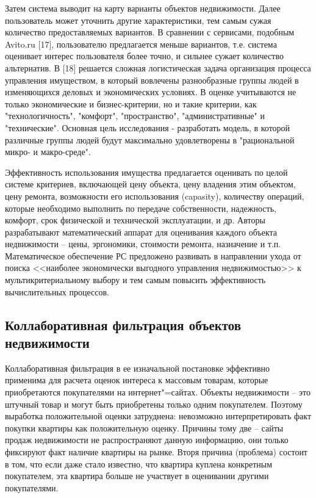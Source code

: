 \documentclass[a4paper,14pt,openany,final]{extreport} %
\begin{document}
Затем система выводит на карту варианты объектов недвижимости. Далее пользователь может уточнить другие характеристики, тем самым сужая количество предоставляемых вариантов. В сравнении с сервисами, подобным Avito.ru [17], пользователю предлагается меньше вариантов, т.е. система оценивает интерес пользователя более точно, и сильнее сужает количество альтернатив.
В [18] решается сложная логистическая задача организация процесса управления имуществом, в который вовлечены разнообразные группы людей в изменяющихся деловых и экономических условиях. В оценке учитываются не только экономические и бизнес-критерии, но и такие критерии, как "технологичность", "комфорт", "пространство", "административные" и "технические". Основная цель исследования - разработать модель, в которой различные группы людей будут максимально удовлетворены в "рациональной микро- и макро-среде".

Эффективность использования имущества предлагается оценивать по целой системе критериев, включающей цену объекта, цену владения этим объектом, цену ремонта, возможности его использования (capasity), количеству операций, которые необходимо выполнить по передаче собственности, надежность, комфорт, срок физической и технической эксплуатации, и др. Авторы разрабатывают математический аппарат для оценивания каждого объекта недвижимости – цены, эргономики, стоимости ремонта, назначение и т.п. Математическое обеспечение РС предложено развивать в направлении ухода от поиска <<наиболее экономически выгодного управления недвижимостью>> к мультикритериальному выбору и тем самым повысить эффективность вычислительных процессов.

\subsection{Коллаборативная фильтрация объектов недвижимости} %
\label{sec:coll-filtering-rspo}

Коллаборативная фильтрация в ее изначальной постановке эффективно применима для расчета оценок интереса к массовым товарам, которые приобретаются покупателями на интернет"=сайтах.  Объекты недвижимости -- это штучный товар и могут быть приобретены только одним покупателем. Поэтому выработка положительной оценки затруднена: невозможно интерпретировать факт покупки квартиры как положительную оценку. Причины тому две -- сайты продаж недвижимости не распространяют данную информацию, они только фиксируют факт наличие квартиры на рынке. Вторя причина (проблема) состоит в том, что если даже стало известно, что квартира куплена конкретным покупателем, эта квартира больше не участвует в оценивании другими покупателями.
\end{document}
